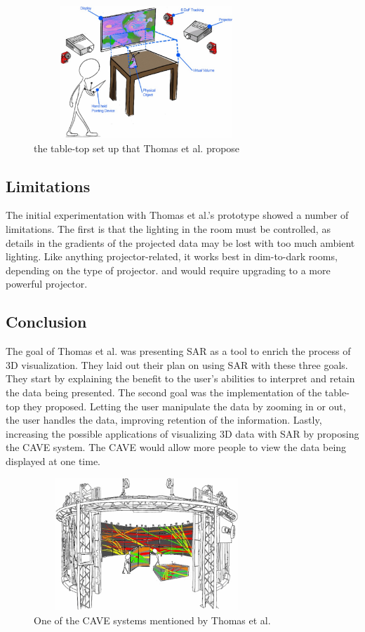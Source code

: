 \documentclass{sig-alternate}
\begin{document}
\begin{figure}
	\includegraphics[width=8.5cm, height=5cm]{Tabletop}
	\caption{the table-top set up that Thomas et al. propose \cite{3D}}
	\label{fig:Tabletop}
\end{figure}

\subsection{Limitations}
\label{sec:Limitations}
The initial experimentation with Thomas et al.'s \cite{3D} prototype showed a number of limitations. The first is that the lighting in the room must be controlled, as details in the gradients of the projected data may be lost with too much ambient lighting. Like anything projector-related, it works best in dim-to-dark rooms, depending on the type of projector. and would require upgrading to a more powerful projector.

\subsection{Conclusion}
\label{sec:Conclusion}
The goal of Thomas et al. \cite{3D} was presenting SAR as a tool to enrich the process of 3D visualization. They laid out their plan on using SAR with these three goals. They start by explaining the benefit to the user's abilities to interpret and retain the data being presented. The second goal was the implementation of the table-top they proposed. Letting the user manipulate the data by zooming in or out, the user handles the data, improving retention of the information. Lastly, increasing the possible applications of visualizing 3D data with SAR by proposing the CAVE system. The CAVE would allow more people to view the data being displayed at one time.

\begin{figure}
	\includegraphics[width=8.5cm, height=5cm]{Cave}
	\caption{One of the CAVE systems mentioned by Thomas et al. \cite{3D}}
	\label{fig:Cave}
\end{figure}  
\end{document}

